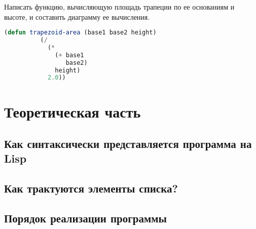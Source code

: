 \documentclass[a4paper,oneside,12pt]{extreport}
\begin{document}
\begin{task}
	Написать функцию, вычисляющую площадь трапеции по ее основаниям и высоте, и составить диаграмму ее вычисления.
	\begin{lstlisting}[language=Lisp, gobble=16]
		(defun trapezoid-area (base1 base2 height)
		  (/
		    (*
		      (+ base1
		         base2)
		      height)
		    2.0))
	\end{lstlisting}
\end{task}

\section*{Теоретическая часть}

\subsection*{Как синтаксически представляется программа на Lisp}

\subsection*{Как трактуются элементы списка?}

\subsection*{Порядок реализации программы}
\end{document}
